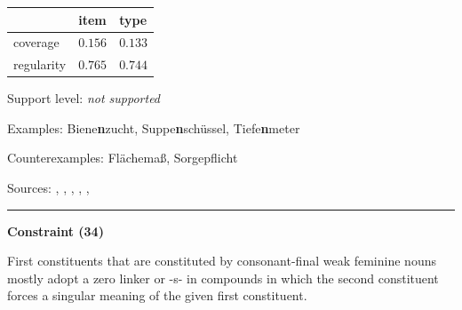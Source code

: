 \vspace{-0.25em}

\begin{table}[!ht]
\begin{center}
\setlength{\extrarowheight}{1pt}
\begin{tabularx}{\columnwidth}{|X|X|X|}
\hline
 & item & type \\
\hline
 coverage & $0.156$ & $0.133$ \\
\hline
 regularity & $0.765$ & $0.744$ \\
\hline
\end{tabularx}
\end{center}
\end{table}

\vspace{-1.35em}

\noindent
Support level: \textit{not supported}

\vspace{0.3em}

\noindent
Examples: Biene\textbf{n}zucht, Suppe\textbf{n}schüssel, Tiefe\textbf{n}meter

\noindent
Counterexamples: Fläche{\zeroLinker}maß, Sorge{\zeroLinker}pflicht

\vspace{0.3em}

\noindent
Sources: \citet[229]{eisenberg_2013}, \citet[573]{fuhrhop_kuerschner_2015}, \citet[3]{krott_etal_2007}, \citet[151, 157]{libben_etal_2009}, \citet[83, 92]{ortner_mueller-bollhagen_1991}, \citet[9]{schaefer_pankratz_2018}

\vspace{0.35em}
\hrule




\vspace{0.4em}

\begin{center}
\textbf{Constraint (34)}
\end{center}

\noindent
First constituents that are constituted by consonant-final weak feminine nouns mostly adopt a zero linker or -s- in compounds in which the second constituent forces a singular meaning of the given first constituent.
\vspace{0.5em}



